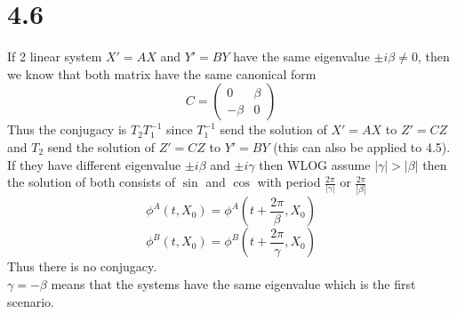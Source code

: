 \documentclass[11pt]{article}
\theoremstyle{mystyle}
\theoremstyle{definition}
\begin{document}
\section*{4.6}
If 2 linear system $X' = AX$ and $Y' = BY$ have the same eigenvalue $\pm i\beta \ne 0$, then we know that both matrix have the same canonical form 
\[
  C = \begin{pmatrix}
    0 & \beta \\
    -\beta & 0 
  \end{pmatrix}
\]
Thus the conjugacy is $T_2 T_1^{-1}$ since $T_1^{-1}$ send the solution of $X' =AX$ to $Z' = CZ$ and $T_2$ send the solution of $Z' = CZ$ to $Y' = BY$ (this can also be applied to 4.5). \\
If they have different eigenvalue $\pm i\beta$ and $\pm i\gamma$ then WLOG assume $|\gamma| > |\beta|$ then the solution of both consists of $\sin$ and $\cos$ with period $\displaystyle\frac{2\pi}{|\gamma|}$ or $\displaystyle\frac{2\pi}{|\beta|}$  
\[
  \phi^A(t,X_0) = \phi^A(t + \displaystyle\frac{2\pi}{\beta}, X_0)
\]
\[
  \phi^B(t,X_0) = \phi^B(t + \displaystyle\frac{2\pi}{\gamma}, X_0)
\]
Thus there is no conjugacy. \\
$\gamma = - \beta$ means that the systems have the same eigenvalue which is the first scenario. 
\end{document}
